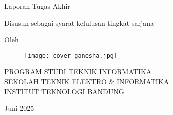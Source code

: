 \clearpage
\pagestyle{empty}

\begin{center}
    \smallskip
    
    \Large \bfseries \MakeUppercase{\thetitle}
    \vfill
    
    \Large Laporan Tugas Akhir
    \vfill
    
    \large Disusun sebagai syarat kelulusan tingkat sarjana
    \vfill
    
    \large Oleh
    
    \Large \theauthor
    
    \vfill
    \begin{figure}[h]
        \centering
        \texttt{[image: cover-ganesha.jpg]}
    \end{figure}
    \vfill
    
    \large
    \uppercase{
        Program Studi Teknik Informatika \\
        Sekolah Teknik Elektro \& Informatika \\
        Institut Teknologi Bandung
    }
    
    Juni 2025
    
\end{center}

\clearpage
